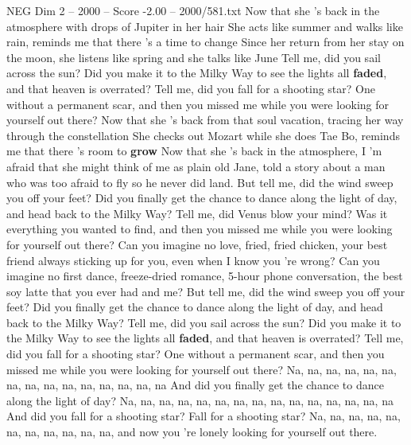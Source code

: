 \begin{textsample}{NEG Dim 2 – 2000 – Score -2.00 – 2000/581.txt}  \label{ex:f2_neg_039}
Now that she 's back in the atmosphere with drops of Jupiter in her hair She acts like summer and walks like rain, reminds me that there 's a time to change Since her return from her stay on the moon, she listens like spring and she talks like June Tell me, did you sail across the sun?
Did you make it to the Milky Way to see the lights all \textbf{faded}, and that heaven is overrated?
Tell me, did you fall for a shooting star?
One without a permanent scar, and then you missed me while you were looking for yourself out there?
Now that she 's back from that soul vacation, tracing her way through the constellation She checks out Mozart while she does Tae Bo, reminds me that there 's room to \textbf{grow} Now that she 's back in the atmosphere, I 'm afraid that she might think of me as plain old Jane, told a story about a man who was too afraid to fly so he never did land.
But tell me, did the wind sweep you off your feet?
Did you finally get the chance to dance along the light of day, and head back to the Milky Way?
Tell me, did Venus blow your mind?
Was it everything you wanted to find, and then you missed me while you were looking for yourself out there?
Can you imagine no love, fried, fried chicken, your best friend always sticking up for you, even when I know you 're wrong?
Can you imagine no first dance, freeze-dried romance, 5-hour phone conversation, the best soy latte that you ever had and me?
But tell me, did the wind sweep you off your feet?
Did you finally get the chance to dance along the light of day, and head back to the Milky Way?
Tell me, did you sail across the sun?
Did you make it to the Milky Way to see the lights all \textbf{faded}, and that heaven is overrated?
Tell me, did you fall for a shooting star?
One without a permanent scar, and then you missed me while you were looking for yourself out there?
Na, na, na, na, na, na, na, na, na, na, na, na, na, na, na And did you finally get the chance to dance along the light of day?
Na, na, na, na, na, na, na, na, na, na, na, na, na, na, na And did you fall for a shooting star?
Fall for a shooting star?
Na, na, na, na, na, na, na, na, na, na, na, and now you 're lonely looking for yourself out there.

\end{textsample}
